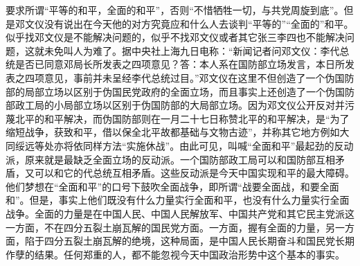 要求所谓“平等的和平，全面的和平”，否则“不惜牺牲一切，与共党周旋到底”。但是邓文仪没有说出在今天他的对方究竟应和什么人去谈判“平等的”“全面的”和平。似乎找邓文仪是不能解决问题的，似乎不找邓文仪或者其它张三李四也不能解决问题，这就未免叫人为难了。据中央社上海九日电称：“新闻记者问邓文仪：李代总统是否已同意邓局长所发表之四项意见？答：本人系在国防部立场发言，本日所发表之四项意见，事前并未呈经李代总统过目。”邓文仪在这里不但创造了一个伪国防部的局部立场以区别于伪国民党政府的全面立场，而且事实上还创造了一个伪国防部政工局的小局部立场以区别于伪国防部的大局部立场。因为邓文仪公开反对并污蔑北平的和平解决，而伪国防部则在一月二十七日称赞北平的和平解决，是“为了缩短战争，获致和平，借以保全北平故都基础与文物古迹”，并称其它地方例如大同绥远等处亦将依同样方法“实施休战”。由此可见，叫喊“全面和平”最起劲的反动派，原来就是最缺乏全面立场的反动派。一个国防部政工局可以和国防部互相矛盾，又可以和它的代总统互相矛盾。这些反动派是今天中国实现和平的最大障碍。他们梦想在“全面和平”的口号下鼓吹全面战争，即所谓“战要全面战，和要全面和”。但是，事实上他们既没有什么力量实行全面和平，也没有什么力量实行全面战争。全面的力量是在中国人民、中国人民解放军、中国共产党和其它民主党派这一方面，不在四分五裂土崩瓦解的国民党方面。一方面，握有全面的力量，另一方面，陷于四分五裂土崩瓦解的绝境，这种局面，是中国人民长期奋斗和国民党长期作孽的结果。任何郑重的人，都不能忽视今天中国政治形势中这个基本的事实。



